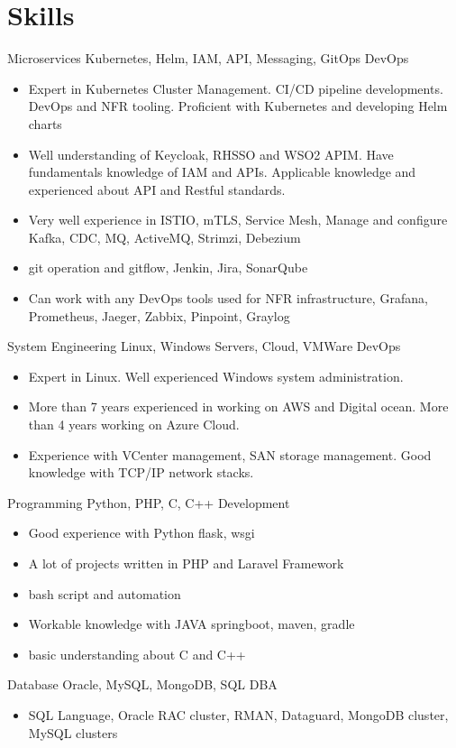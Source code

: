 \documentclass[]{friggeri-cv}
\begin{document}
\section{Skills}
\begin{entrylist}
  \entry
  {Microservices}
  {Kubernetes, Helm, IAM, API, Messaging, GitOps}
  {DevOps}
  {  \begin{itemize}
      \item Expert in Kubernetes Cluster Management. CI/CD pipeline developments. DevOps and NFR tooling. Proficient with Kubernetes and developing Helm charts
      \item Well understanding of Keycloak, RHSSO and WSO2 APIM. Have fundamentals knowledge of IAM and APIs. Applicable knowledge and experienced about API and Restful standards.
      \item Very well experience in ISTIO, mTLS, Service Mesh, Manage and configure Kafka, CDC, MQ, ActiveMQ, Strimzi, Debezium
      \item git operation and gitflow, Jenkin, Jira, SonarQube
      \item Can work with any DevOps tools used for NFR infrastructure, Grafana, Prometheus, Jaeger, Zabbix, Pinpoint, Graylog
    \end{itemize}}
  \entry
  {System Engineering}
  {Linux, Windows Servers, Cloud, VMWare}
  {DevOps}
  {  \begin{itemize}
        \item Expert in Linux. Well experienced Windows system administration.
        \item More than 7 years experienced in working on AWS and Digital ocean. More than 4 years working on Azure Cloud.
        \item Experience with VCenter management, SAN storage management. Good knowledge with TCP/IP network stacks.
      \end{itemize}}
  \entry
  {Programming}
  {Python, PHP, C, C++}
  {Development}
  { \begin{itemize}
      \item Good experience with Python flask, wsgi
      \item A lot of projects written in PHP and Laravel Framework
      \item bash script and automation
      \item Workable knowledge with JAVA springboot, maven, gradle
      \item basic understanding about C and C++
    \end{itemize}}
  \entry
  {Database}
  {Oracle, MySQL, MongoDB, SQL}
  {DBA}
  { \begin{itemize}
      \item SQL Language, Oracle RAC cluster, RMAN, Dataguard, MongoDB cluster, MySQL clusters
    \end{itemize}}
  
\end{entrylist}
\end{document}
